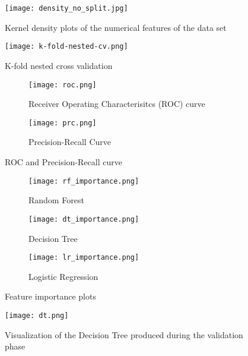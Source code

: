 \begin{figure}[ht]
    \centering
    \texttt{[image: density\_no\_split.jpg]}
    \caption{Kernel density plots of the numerical features of the data set}
    \label{fig:density}
\end{figure}
\begin{figure}[ht]
 \centering
 \texttt{[image: k-fold-nested-cv.png]}
 \caption{K-fold nested cross validation \cite{RN194}}
 \label{fig:cv}
\end{figure}
\begin{figure}
 \centering
 \begin{subfigure}{0.6\textwidth}
  \centering
  \texttt{[image: roc.png]}
  \caption{Receiver Operating Characterisitcs (ROC) curve}
  \label{fig:roc}
 \end{subfigure}
 \begin{subfigure}{0.6\textwidth}
  \centering
  \texttt{[image: prc.png]}
  \caption{Precision-Recall Curve}
  \label{fig:prc}
 \end{subfigure}
 \caption{ROC and Precision-Recall curve}
 \label{fig:prc-roc}
\end{figure}

\begin{figure}
 \begin{subfigure}{0.5\textwidth}
  \texttt{[image: rf\_importance.png]}
  \caption{Random Forest}
  \label{fig:rf_importance}
 \end{subfigure}
 \begin{subfigure}{0.5\textwidth}
  \texttt{[image: dt\_importance.png]}
  \caption{Decision Tree}
  \label{fig:dt_importance}
 \end{subfigure}
 \begin{subfigure}{\textwidth}
 \centering
  \texttt{[image: lr\_importance.png]}
  \caption{Logistic Regression}
  \label{fig:lr_importance}
 \end{subfigure}
 \caption{Feature importance plots}
 \label{fig:feature-importance}
\end{figure}
\begin{figure}
 \texttt{[image: dt.png]}
 \caption{Visualization of the Decision Tree produced during the validation 
phase}
 \label{fig:dt}
\end{figure}


